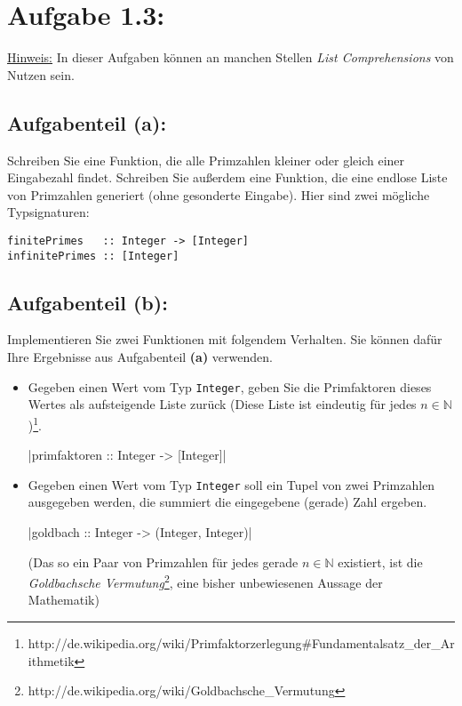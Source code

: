\documentclass[a4paper,10pt]{scrartcl}
\newcommand{\theuebungszettel}{1}
\begin{document}
\section*{Aufgabe \theuebungszettel.3:}

\underline{Hinweis:} In dieser Aufgaben können an manchen Stellen \emph{List Comprehensions} von Nutzen sein.

\subsection*{Aufgabenteil (a):}

Schreiben Sie eine Funktion, die alle Primzahlen kleiner oder gleich einer Eingabezahl findet. Schreiben Sie außerdem eine Funktion, die eine endlose Liste von Primzahlen generiert (ohne gesonderte Eingabe).
Hier sind zwei mögliche Typsignaturen:

\begin{verbatim}
finitePrimes   :: Integer -> [Integer]
infinitePrimes :: [Integer]
\end{verbatim}

\subsection*{Aufgabenteil (b):}

Implementieren Sie zwei Funktionen mit folgendem Verhalten. Sie können dafür Ihre Ergebnisse aus Aufgabenteil \textbf{(a)} verwenden.

\begin{itemize}
\item Gegeben einen Wert vom Typ \texttt{Integer}, geben Sie die Primfaktoren dieses Wertes
      als aufsteigende Liste zurück (Diese Liste ist eindeutig für jedes $n \in \mathbb{N}$)\footnote{http://de.wikipedia.org/wiki/Primfaktorzerlegung\#Fundamentalsatz\_der\_Arithmetik}.

      |primfaktoren :: Integer -> [Integer]|

\item Gegeben einen Wert vom Typ \texttt{Integer} soll ein Tupel von zwei Primzahlen ausgegeben
      werden, die summiert die eingegebene (gerade) Zahl ergeben.

      |goldbach :: Integer -> (Integer, Integer)|
      
      (Das so ein Paar von Primzahlen für jedes gerade $n \in \mathbb{N}$ existiert, ist die 
      \emph{Goldbachsche Vermutung}\footnote{http://de.wikipedia.org/wiki/Goldbachsche\_Vermutung}, 
      eine bisher unbewiesenen Aussage der Mathematik)
\end{itemize}
\end{document}
